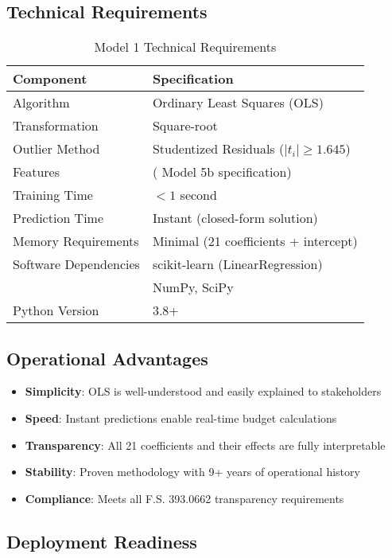 \subsection{Technical Requirements}

\begin{table}[H]
\centering
\caption{Model 1 Technical Requirements}
\begin{tabular}{ll}
\toprule
\textbf{Component} & \textbf{Specification} \\
\midrule
Algorithm & Ordinary Least Squares (OLS) \\
Transformation & Square-root \\
Outlier Method & Studentized Residuals ($|t_i| \geq 1.645$) \\
Features & \ModelOneNumFeatures{} ( Model 5b specification) \\
Training Time & $< 1$ second \\
Prediction Time & Instant (closed-form solution) \\
Memory Requirements & Minimal (21 coefficients + intercept) \\
\midrule
Software Dependencies & scikit-learn (LinearRegression) \\
& NumPy, SciPy \\
Python Version & 3.8+ \\
\bottomrule
\end{tabular}
\end{table}

\subsection{Operational Advantages}

\begin{itemize}
    \item \textbf{Simplicity}: OLS is well-understood and easily explained to stakeholders
    \item \textbf{Speed}: Instant predictions enable real-time budget calculations
    \item \textbf{Transparency}: All 21 coefficients and their effects are fully interpretable
    \item \textbf{Stability}: Proven methodology with 9+ years of operational history
    \item \textbf{Compliance}: Meets all F.S. 393.0662 transparency requirements
\end{itemize}

\subsection{Deployment Readiness}

